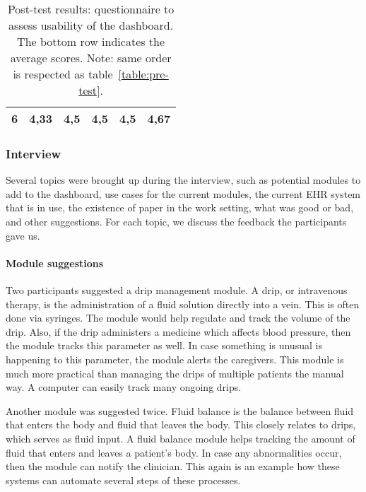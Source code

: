\begin{table}[!t]
{\begin{tabular}{cccccc}
        \textbf{6}                                                                    & \textbf{4,33}                                                          & \textbf{4,5}                                                                  & \textbf{4,5}                                                                & \textbf{4,5}                                                                                       & \textbf{4,67}                                                                   \\ \hline
        \end{tabular}%
        }
        \caption{Post-test results: questionnaire to assess usability of the dashboard. The bottom row indicates the average scores. Note: same order is respected as table~\ref{table:pre-test}.}\label{table:post-test}
    \end{table}

    \subsubsection{Interview}

    Several topics were brought up during the interview, such as potential modules to add to the dashboard, use cases for the current modules, the current EHR system that is in use, the existence of paper in the work setting, what was good or bad, and other suggestions. For each topic, we discuss the feedback the participants gave us.

    \paragraph{Module suggestions} Two participants suggested a drip management module. A drip, or intravenous therapy, is the administration of a fluid solution directly into a vein. This is often done via syringes. The module would help regulate and track the volume of the drip. Also, if the drip administers a medicine which affects blood pressure, then the module tracks this parameter as well. In case something is unusual is happening to this parameter, the module alerts the caregivers. This module is much more practical than managing the drips of multiple patients the manual way. A computer can easily track many ongoing drips.

    Another module was suggested twice. Fluid balance is the balance between fluid that enters the body and fluid that leaves the body. This closely relates to drips, which serves as fluid input. A fluid balance module helps tracking the amount of fluid that enters and leaves a patient's body. In case any abnormalities occur, then the module can notify the clinician. This again is an example how these systems can automate several steps of these processes.

